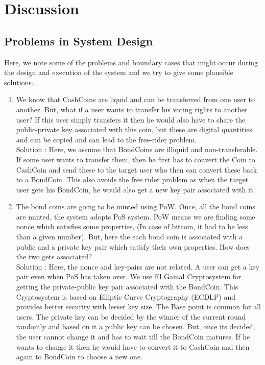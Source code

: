 \section{Discussion}

\subsection{Problems in System Design}

Here, we note some of the problems and boundary cases that might occur during the design and execution of the system and we try to give some plausible solutions.

\begin{enumerate}
    \item We know that CashCoins are liquid and can be transferred from one user to another. But, what if a user wants to transfer his voting rights to another user? If this user simply transfers it then he would also have to share the public-private key associated with this coin, but these are digital quantities and can be copied and can lead to the free-rider problem.\\
    Solution : Here, we assume that BondCoins are illiquid and non-transferable. If some user wants to transfer them, then he first has to convert the Coin to CashCoin and send these to the target user who then can convert these back to a BondCoin. This also avoids the free rider problem as when the target user gets his BondCoin, he would also get a new key pair associated with it.
    \item The bond coins are going to be minted using PoW. Once, all the bond coins are minted, the system adopts PoS system. PoW means we are finding some nonce which satisfies some properties, (In case of bitcoin, it had to be less than a given number). But, here the each bond coin is associated with a public and a private key pair which satisfy their own properties. How does the two gets associated?\\
    Solution : Here, the nonce and key-pairs are not related. A user can get a key pair even when PoS has taken over. We use El Gamal Cryptosystem for getting the private-public key pair associated with the BondCoin. This Cryptosystem is based on Elliptic Curve Cryptography (ECDLP) and provides better security with lesser key size. The Base point is common for all users. The private key can be decided by the winner of the current round randomly and based on it a public key can be chosen. But, once its decided, the user cannot change it and has to wait till the BondCoin matures. If he wants to change it then he would have to convert it to CashCoin and then again to BondCoin to choose a new one.

\end{enumerate}
